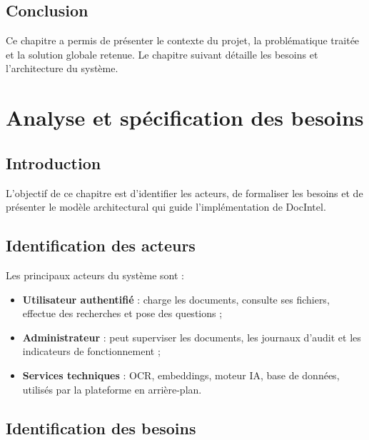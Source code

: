 \documentclass[12pt,a4paper]{report}
\begin{document}
\section{Conclusion}
Ce chapitre a permis de présenter le contexte du projet, la problématique traitée et la solution globale retenue. Le chapitre suivant détaille les besoins et l'architecture du système.

\chapter{Analyse et sp\'ecification des besoins}

\section{Introduction}
L'objectif de ce chapitre est d'identifier les acteurs, de formaliser les besoins et de présenter le modèle architectural qui guide l'implémentation de DocIntel.

\section{Identification des acteurs}
Les principaux acteurs du système sont :
\begin{itemize}
  \item \textbf{Utilisateur authentifié} : charge les documents, consulte ses fichiers, effectue des recherches et pose des questions ;
  \item \textbf{Administrateur} : peut superviser les documents, les journaux d'audit et les indicateurs de fonctionnement ;
  \item \textbf{Services techniques} : OCR, embeddings, moteur IA, base de données, utilisés par la plateforme en arrière-plan.
\end{itemize}

\section{Identification des besoins}
\end{document}
